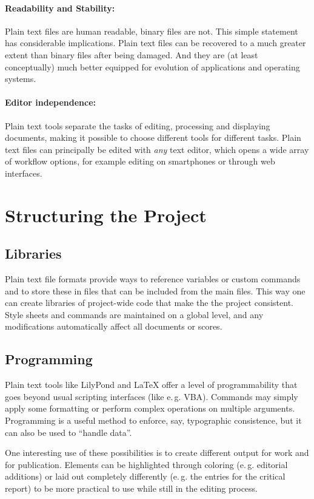 \documentclass[11pt,a4paper]{article}
\begin{document}
\paragraph{Readability and Stability:}
Plain text files are human readable, binary files are not. This simple statement has
considerable implications. Plain text files can be recovered to a much greater extent
than binary files after being damaged. And they are (at least conceptually) much better
equipped for evolution of applications and operating systems.

\paragraph{Editor independence:}
Plain text tools separate the tasks of editing, processing and displaying documents,
making it possible to choose different tools for different tasks. Plain text files
can principally be edited with \emph{any} text editor, which opens a wide array of
workflow options, for example editing on smartphones or through web interfaces.

\section{Structuring the Project}

\subsection{Libraries}
Plain text file formats provide ways to reference variables or custom
commands and to store these in files that can be included from the
main files. This way one can create libraries of project-wide code
that make the the project consistent. Style sheets and commands are
maintained on a global level, and any modifications automatically
affect all documents or scores.

\subsection{Programming}
Plain text tools like LilyPond and \LaTeX{} offer a level of programmability that
goes beyond usual scripting interfaces (like e.\,g. VBA). Commands may simply apply
some formatting or perform complex operations on multiple arguments.
Programming is a useful method to enforce, say, typographic consistence, but it can
also be used to “handle data”.

One interesting use of these possibilities is to create different output for work and for
publication. Elements can be highlighted through coloring (e.\,g. editorial additions)
or laid out completely differently (e.\,g. the entries for the critical report) to be
more practical to use while still in the editing process.
\end{document}
